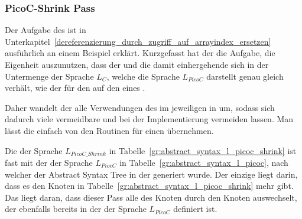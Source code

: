 \subsubsection{PicoC-Shrink Pass}
\label{picoc_shrink_pass}
\label{sec:picoc_shrink_pass_zweck}

Der Aufgabe des  ist in Unterkapitel~\ref{dereferenzierung_durch_zugriff_auf_arrayindex_ersetzen} ausführlich an einem Beispiel erklärt. Kurzgefasst hat der  die Aufgabe, die Eigenheit auszunutzen, dass der   und die damit einhergehende   sich in der Untermenge der Sprache $L_{C}$, welche die Sprache $L_{PicoC}$ darstellt genau gleich verhält, wie der  für den  auf den  eines  .

Daher wandelt der  alle Verwendungen des   im jeweiligen  in   um, sodass sich dadurch viele vermeidbare  und  bei der Implementierung vermeiden lassen. Man lässt die    einfach von den Routinen für einen   übernehmen.


Die  der Sprache $L_{PicoC\_Shrink}$ in Tabelle~\ref{gr:abstract_syntax_l_picoc_shrink} ist fast  mit der  der Sprache $L_{PiocC}$ in Tabelle~\ref{gr:abstract_syntax_l_picoc}, nach welcher der  Abstract Syntax Tree in der  generiert wurde. Der einzige  liegt darin, dass es den Knoten  in Tabelle~\ref{gr:abstract_syntax_l_picoc_shrink}  mehr gibt. Das liegt daran, dass dieser Pass alle  des Knoten  durch den Knoten  auswechselt, der ebenfalls bereits in der  der Sprache $L_{PicoC}$ definiert ist.

\begin{grammar}
  \toprule
  \commentsecond*
  \midrule
  \arith*
  \midrule
  \logic*
  \midrule
  \assign*
  \midrule
  \pntrshrink*
  \midrule
  \arraysecond*
  \midrule
  \struct*
  \midrule
  \ifelse*
  \midrule
  \loopsecond*
  \midrule
  \fun*
  \midrule
  \file*
  \bottomrule
\end{grammar}

